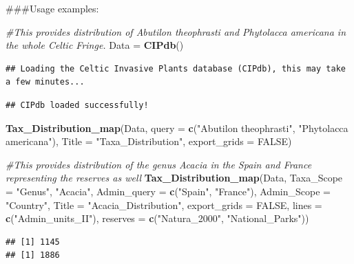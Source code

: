 \documentclass[
]{article}
\newenvironment{Shaded}{\begin{snugshade}}{\end{snugshade}}
\newcommand{\AttributeTok}[1]{\textcolor[rgb]{0.13,0.29,0.53}{#1}}
\newcommand{\CommentTok}[1]{\textcolor[rgb]{0.56,0.35,0.01}{\textit{#1}}}
\newcommand{\ConstantTok}[1]{\textcolor[rgb]{0.56,0.35,0.01}{#1}}
\newcommand{\FunctionTok}[1]{\textcolor[rgb]{0.13,0.29,0.53}{\textbf{#1}}}
\newcommand{\NormalTok}[1]{#1}
\newcommand{\OtherTok}[1]{\textcolor[rgb]{0.56,0.35,0.01}{#1}}
\newcommand{\StringTok}[1]{\textcolor[rgb]{0.31,0.60,0.02}{#1}}
\begin{document}
\#\#\#Usage examples:

\begin{Shaded}
\begin{Highlighting}[]
\CommentTok{\#This provides distribution of Abutilon theophrasti and Phytolacca americana in the whole Celtic Fringe.}
\NormalTok{Data }\OtherTok{=} \FunctionTok{CIPdb}\NormalTok{()}
\end{Highlighting}
\end{Shaded}

\begin{verbatim}
## Loading the Celtic Invasive Plants database (CIPdb), this may take a few minutes...
\end{verbatim}

\begin{verbatim}
## CIPdb loaded successfully!
\end{verbatim}

\begin{Shaded}
\begin{Highlighting}[]
\FunctionTok{Tax\_Distribution\_map}\NormalTok{(Data, }\AttributeTok{query =} \FunctionTok{c}\NormalTok{(}\StringTok{"Abutilon theophrasti"}\NormalTok{, }\StringTok{"Phytolacca americana"}\NormalTok{), }\AttributeTok{Title =} \StringTok{"Taxa\_Distribution"}\NormalTok{, }\AttributeTok{export\_grids =} \ConstantTok{FALSE}\NormalTok{)}

\CommentTok{\#This provides distribution of the genus Acacia in the Spain and France representing the reserves as well}
\FunctionTok{Tax\_Distribution\_map}\NormalTok{(Data, }\AttributeTok{Taxa\_Scope =} \StringTok{"Genus"}\NormalTok{, }\StringTok{"Acacia"}\NormalTok{, }\AttributeTok{Admin\_query =} \FunctionTok{c}\NormalTok{(}\StringTok{"Spain"}\NormalTok{, }\StringTok{"France"}\NormalTok{), }\AttributeTok{Admin\_Scope =} \StringTok{"Country"}\NormalTok{, }\AttributeTok{Title =} \StringTok{"Acacia\_Distribution"}\NormalTok{, }\AttributeTok{export\_grids =} \ConstantTok{FALSE}\NormalTok{, }\AttributeTok{lines =} \FunctionTok{c}\NormalTok{(}\StringTok{"Admin\_units\_II"}\NormalTok{), }\AttributeTok{reserves =} \FunctionTok{c}\NormalTok{(}\StringTok{"Natura\_2000"}\NormalTok{, }\StringTok{"National\_Parks"}\NormalTok{))}
\end{Highlighting}
\end{Shaded}

\begin{verbatim}
## [1] 1145
## [1] 1886
\end{verbatim}
\end{document}
